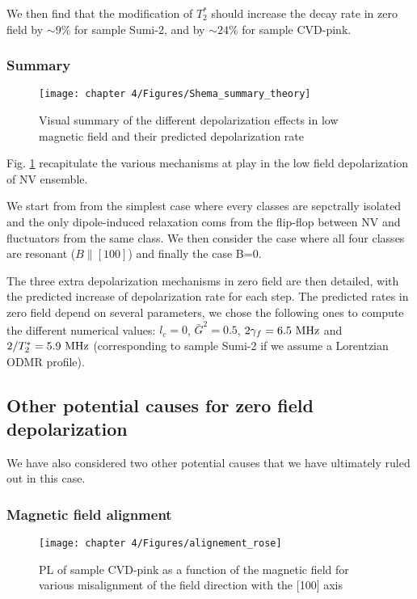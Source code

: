 \documentclass[a4paper,11pt]{report}
\begin{document}
\begin{refsection}
We then find that the modification of $T_2^*$ should increase the decay rate in zero field by $\sim 9 \%$ for sample Sumi-2, and by $\sim 24 \%$ for sample CVD-pink. 


\subsubsection{Summary}
\begin{figure}[h]
\centering
\texttt{[image: chapter 4/Figures/Shema\_summary\_theory]}
\caption{Visual summary of the different depolarization effects in low magnetic field and their predicted depolarization rate}
\label{summary_theory}
\end{figure}

Fig. \ref{summary_theory} recapitulate the various mechanisms at play in the low field depolarization of NV ensemble. 

We start from from the simplest case where every classes are sepctrally isolated and the only dipole-induced relaxation coms from the flip-flop between NV and fluctuators from the same class. We then consider the case where all four classes are resonant ($B\parallel [100]$) and finally the case B=0.

The three extra depolarization mechanisms in zero field are then detailed, with the predicted increase of depolarization rate for each step. The predicted rates in zero field depend on several parameters, we chose the following ones to compute the different numerical values: $l_c=0$, $\bar{G}^2=0.5$, $2\gamma_f = 6.5\ \rm MHz$ and $2/T_2^*=5.9\ \rm MHz$ (corresponding to sample Sumi-2 if we assume a Lorentzian ODMR profile).

\subsection{Other potential causes for zero field depolarization}
We have also considered two other potential causes that we have ultimately ruled out in this case.

\subsubsection{Magnetic field alignment}
\begin{figure}[h]
\centering
\texttt{[image: chapter 4/Figures/alignement\_rose]}
\caption{PL of sample CVD-pink as a function of the magnetic field for various misalignment of the field direction with the [100] axis}
\label{alignement rose}
\end{figure}


\end{refsection}
\end{document}
